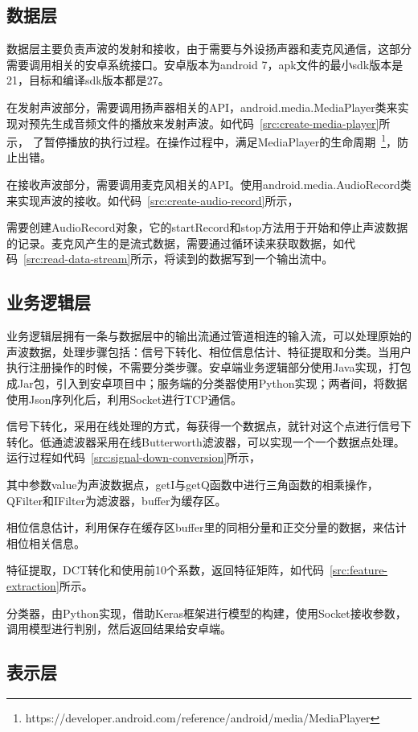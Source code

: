 \subsection{数据层}
数据层主要负责声波的发射和接收，由于需要与外设扬声器和麦克风通信，这部分需要调用相关的安卓系统接口。安卓版本为android 7，apk文件的最小sdk版本是21，目标和编译sdk版本都是27。

在发射声波部分，需要调用扬声器相关的API，android.media.MediaPlayer类来实现对预先生成音频文件的播放来发射声波。如代码~\ref{src:create-media-player}所示，
了暂停播放的执行过程。在操作过程中，满足MediaPlayer的生命周期~\footnote{https://developer.android.com/reference/android/media/MediaPlayer}，防止出错。

在接收声波部分，需要调用麦克风相关的API。使用android.media.AudioRecord类来实现声波的接收。如代码~\ref{src:create-audio-record}所示，

需要创建AudioRecord对象，它的startRecord和stop方法用于开始和停止声波数据的记录。麦克风产生的是流式数据，需要通过循环读来获取数据，如代码~\ref{src:read-data-stream}所示，将读到的数据写到一个输出流中。



\subsection{业务逻辑层}
业务逻辑层拥有一条与数据层中的输出流通过管道相连的输入流，可以处理原始的声波数据，处理步骤包括：信号下转化、相位信息估计、特征提取和分类。当用户执行注册操作的时候，不需要分类步骤。安卓端业务逻辑部分使用Java实现，打包成Jar包，引入到安卓项目中；服务端的分类器使用Python实现；两者间，将数据使用Json序列化后，利用Socket进行TCP通信。

信号下转化，采用在线处理的方式，每获得一个数据点，就针对这个点进行信号下转化。低通滤波器采用在线Butterworth滤波器，可以实现一个一个数据点处理。运行过程如代码~\ref{src:signal-down-conversion}所示，

其中参数value为声波数据点，getI与getQ函数中进行三角函数的相乘操作，QFilter和IFilter为滤波器，buffer为缓存区。

相位信息估计，利用保存在缓存区buffer里的同相分量和正交分量的数据，来估计相位相关信息。

特征提取，DCT转化和使用前10个系数，返回特征矩阵，如代码~\ref{src:feature-extraction}所示。

分类器，由Python实现，借助Keras框架进行模型的构建，使用Socket接收参数，调用模型进行判别，然后返回结果给安卓端。


\subsection{表示层}


